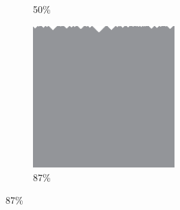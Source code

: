\documentclass[12pt, fleqn]{report}                             %
\theoremstyle{break}                                            %
\begin{document}
\begin{figure}[ht!]
\begin{subfigure}[b]{0.4\linewidth}
          \caption{50\%}
        \end{subfigure}
        \begin{subfigure}[b]{0.4\linewidth}
          \includegraphics[width=0.6\textwidth]{Images/178/d.png}
          \caption{87\%}
        \end{subfigure}
      \end{figure}
\end{document}
